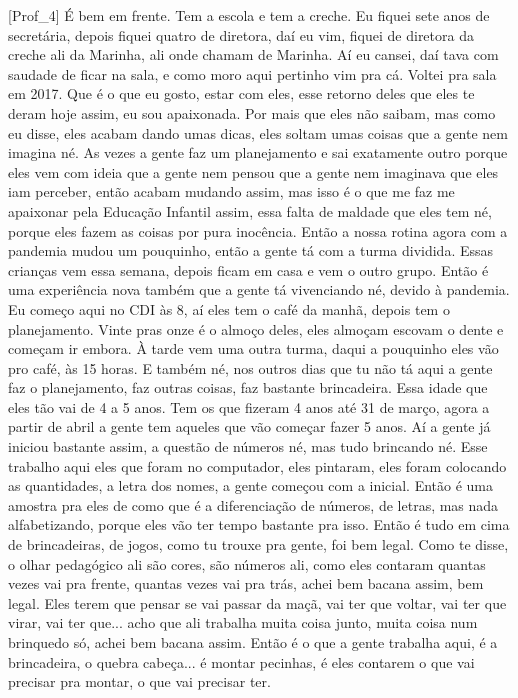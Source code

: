 [Prof\_4] É bem em frente. Tem a escola e tem a creche. Eu fiquei sete anos de secretária, depois fiquei quatro de diretora, daí eu vim, fiquei de diretora da creche ali da Marinha, ali onde chamam de Marinha. Aí eu cansei, daí tava com saudade de ficar na sala, e como moro aqui pertinho vim pra cá. Voltei pra sala em 2017. Que é o que eu gosto, estar com eles, esse retorno deles que eles te deram hoje assim, eu sou apaixonada. Por mais que eles não saibam, mas como eu disse, eles acabam dando umas dicas, eles soltam umas coisas que a gente nem imagina né. As vezes a gente faz um planejamento e sai exatamente outro porque eles vem com ideia que a gente nem pensou que a gente nem imaginava que eles iam perceber, então acabam mudando assim, mas isso é o que me faz me apaixonar pela Educação Infantil assim, essa falta de maldade que eles tem né, porque eles fazem as coisas por pura inocência. Então a nossa rotina agora com a pandemia mudou um pouquinho, então a gente tá com a turma dividida. Essas crianças vem essa semana, depois ficam em casa e vem o outro grupo. Então é uma experiência nova também que a gente tá vivenciando né, devido à pandemia. Eu começo aqui no CDI às 8, aí eles tem o café da manhã, depois tem o planejamento. Vinte pras onze é o almoço deles, eles almoçam escovam o dente e começam ir embora. À tarde vem uma outra turma, daqui a pouquinho eles vão pro café, às 15 horas. E também né, nos outros dias que tu não tá aqui a gente faz o planejamento, faz outras coisas, faz bastante brincadeira. Essa idade que eles tão vai de 4 a 5 anos. Tem os que fizeram 4 anos até 31 de março, agora a partir de abril a gente tem aqueles que vão começar fazer 5 anos. Aí a gente já iniciou bastante assim, a questão de números né, mas tudo brincando né. Esse trabalho aqui eles que foram no computador, eles pintaram, eles foram colocando as quantidades, a letra dos nomes, a gente começou com a inicial. Então é uma amostra pra eles de como que é a diferenciação de números, de letras, mas nada alfabetizando, porque eles vão ter tempo bastante pra isso. Então é tudo em cima de brincadeiras, de jogos, como tu trouxe pra gente, foi bem legal. Como te disse, o olhar pedagógico ali são cores, são números ali, como eles contaram quantas vezes vai pra frente, quantas vezes vai pra trás, achei bem bacana assim, bem legal. Eles terem que pensar se vai passar da maçã, vai ter que voltar, vai ter que virar, vai ter que... acho que ali trabalha muita coisa junto, muita coisa num brinquedo só, achei bem bacana assim. Então é o que a gente trabalha aqui, é a brincadeira, o quebra cabeça... é montar pecinhas, é eles contarem o que vai precisar pra montar, o que vai precisar ter.

